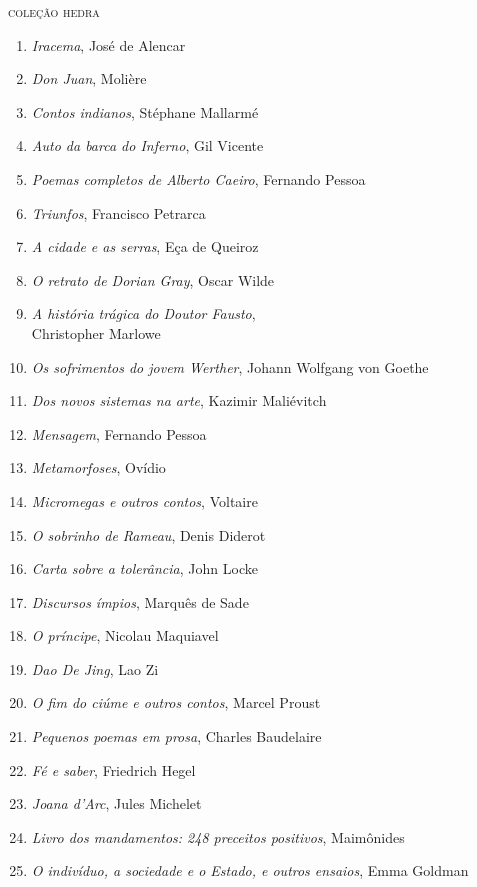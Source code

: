 \ifodd\thepage\paginabranca\else\clearpage\fi
\pagestyle{empty}

\begingroup
\normalsize
{\large\textsc{coleção hedra}}\\
\begin{enumerate}
\setlength\parskip{4.2pt}
\setlength\itemsep{-1.4mm}
\item \textit{Iracema}, José de Alencar
\item \textit{Don Juan}, Molière
\item \textit{Contos indianos}, Stéphane Mallarmé
\item \textit{Auto da barca do Inferno}, Gil Vicente
\item \textit{Poemas completos de Alberto Caeiro}, Fernando Pessoa
\item \textit{Triunfos}, Francisco Petrarca
\item \textit{A cidade e as serras}, Eça de Queiroz
\item \textit{O retrato de Dorian Gray}, Oscar Wilde
\item \textit{A história trágica do Doutor Fausto},\\ Christopher Marlowe
\item \textit{Os sofrimentos do jovem Werther}, Johann Wolfgang von Goethe
\item \textit{Dos novos sistemas na arte}, Kazimir Maliévitch
\item \textit{Mensagem}, Fernando Pessoa
\item \textit{Metamorfoses}, Ovídio
\item \textit{Micromegas e outros contos}, Voltaire
\item \textit{O sobrinho de Rameau}, Denis Diderot
\item \textit{Carta sobre a tolerância}, John Locke
\item \textit{Discursos ímpios}, Marquês de Sade
\item \textit{O príncipe}, Nicolau Maquiavel
\item \textit{Dao De Jing}, Lao Zi
\item \textit{O fim do ciúme e outros contos}, Marcel Proust
\item \textit{Pequenos poemas em prosa}, Charles Baudelaire
\item \textit{Fé e saber}, Friedrich Hegel
\item \textit{Joana d'Arc}, Jules Michelet
\item \textit{Livro dos mandamentos: 248 preceitos positivos}, Maimônides
\item \textit{O indivíduo, a sociedade e o Estado, e outros ensaios}, Emma Goldman

\end{enumerate}
